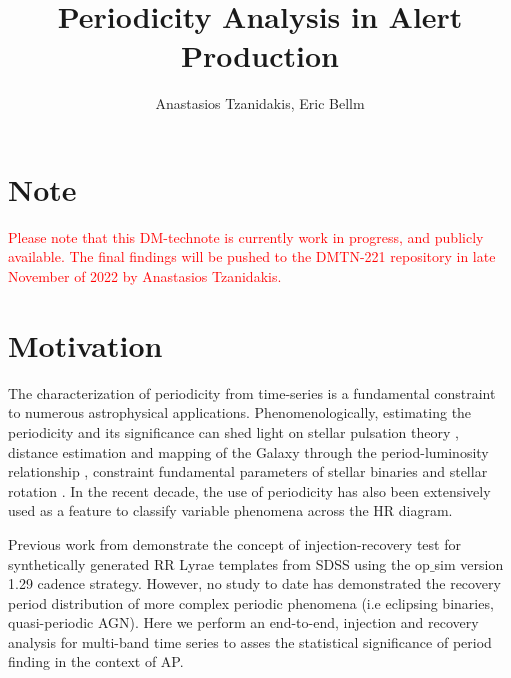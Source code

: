 \documentclass[DM,authoryear,toc]{lsstdoc}
\title{Periodicity Analysis in Alert Production}
\author{%
Anastasios Tzanidakis, Eric Bellm
}
\date{\vcsDate}
\begin{document}
\maketitle


\section{Note}
\textcolor{red}{Please note that this DM-technote is currently work in progress, and publicly available. The final findings will be pushed to the DMTN-221 repository in late November of 2022 by Anastasios Tzanidakis.}


\section{Motivation}
The characterization of periodicity from time-series is a fundamental constraint to numerous astrophysical applications. Phenomenologically, estimating the periodicity and its significance can shed light on stellar pulsation theory \citep{Antonello:Antonello81}, distance estimation and mapping of the Galaxy through the period-luminosity relationship \citep{Skowron:Skowron2019}, constraint fundamental parameters of stellar binaries \citep{Farinella:Farinella1979} and stellar rotation \citep{Walkowicz:Walkowicz13}. In the recent decade, the use of periodicity has also been extensively used as a feature to classify variable phenomena \citep{Richards:R13} across the HR diagram. 


Previous work from \cite{2012AJ....144....9O} demonstrate the concept of injection-recovery test for synthetically generated RR Lyrae templates from SDSS using the op$\_$sim version 1.29 cadence strategy. However, no study to date has demonstrated the recovery period distribution of more complex periodic phenomena (i.e eclipsing binaries, quasi-periodic AGN). Here we perform an end-to-end, injection and recovery analysis for multi-band time series to asses the statistical significance of period finding in the context of AP. 
\end{document}
